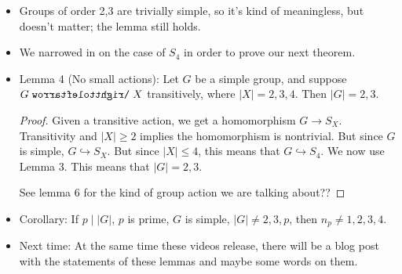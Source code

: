 \documentclass[../notes.tex]{subfiles}
\begin{document}
\begin{itemize}
\begin{proof}
        We know that $A_4\triangleleft S_4\twoheadrightarrow S_4/A_4\cong\Z/2\Z$. Now let $G\triangleleft S_4$. We can apply a homomorphism to get a map from $G\to S_4/A_4$. It follows by the above claim that the homomorphism is either trivial or injective.\par
        Let $\Gamma$ be a group with $A\triangleleft\Gamma$. Let $\Gamma/A=B$. If $G\hookrightarrow\Gamma$ is simple, then either $G\hookrightarrow A$ or $G\hookrightarrow\Gamma/A=B$. Proof: We have $G\to\Gamma\to\Gamma/A=B$. Case 1: $G$ injects into $B$, so we get the latter claim. Case 2: the map is trivial, so everything in $G$ maps to the identity in $B=\Gamma/A$. Then $G\leq A$. So if we know how to divide our group up, we can make something of the pieces.\par
        Returning to our example, we have $A_r\triangleleft S_4$, $S_4/A_4=\Z/2\Z$, so $G\hookrightarrow A_4$, $G\hookrightarrow\Z/2\Z$. In the latter case, it has order 2. We have $K\triangleleft A_4$ and $A_4/K\equiv\Z/3\Z$. So either $G\leq K$ or $G\leq\Z/3\Z$. The first one implies since $K=(\Z/2\Z)^2$ that $G\triangleleft\Z/2\Z$.
    \end{proof}
    \item Groups of order 2,3 are trivially simple, so it's kind of meaningless, but doesn't matter; the lemma still holds.
    \item We narrowed in on the case of $S_4$ in order to prove our next theorem.
    \item Lemma 4 (No small actions): Let $G$ be a simple group, and suppose $G\acts X$ transitively, where $|X|=2,3,4$. Then $|G|=2,3$.
    \begin{proof}
        Given a transitive action, we get a homomorphism $G\to S_X$. Transitivity and $|X|\geq 2$ implies the homomorphism is nontrivial. But since $G$ is simple, $G\hookrightarrow S_X$. But since $|X|\leq 4$, this means that $G\hookrightarrow S_4$. We now use Lemma 3. This means that $|G|=2,3$.\par
        See lemma 6 for the kind of group action we are talking about??
    \end{proof}
    \item Corollary: If $p\mid |G|$, $p$ is prime, $G$ is simple, $|G|\neq 2,3,p$, then $n_p\neq 1,2,3,4$.
    \item Next time: At the same time these videos release, there will be a blog post with the statements of these lemmas and maybe some words on them.
\end{itemize}
\end{document}
